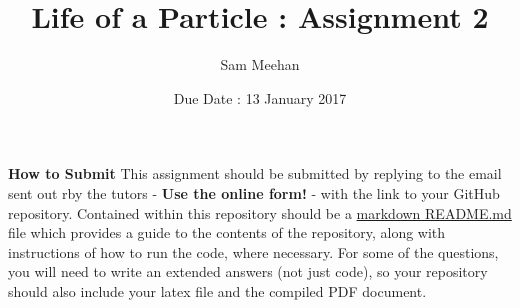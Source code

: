 \documentclass[12pt]{article}
\title{Life of a Particle : Assignment 2}
\author{Sam Meehan}
\date{Due Date : 13 January 2017}
\begin{document}
\maketitle

\textbf{How to Submit}
\newline
This assignment should be submitted by replying to the email sent out rby the tutors - \textbf{Use the online form!} - with the link to your GitHub repository.  Contained within this repository should be a \href{https://github.com/adam-p/markdown-here/wiki/Markdown-Cheatsheet}{markdown README.md} file which provides a guide to the contents of the repository, along with instructions of how to run the code, where necessary.  For some of the questions, you will need to write an extended answers (not just code), so your repository should also include your latex file and the compiled PDF document.  
\newline
\newline
\end{document}

